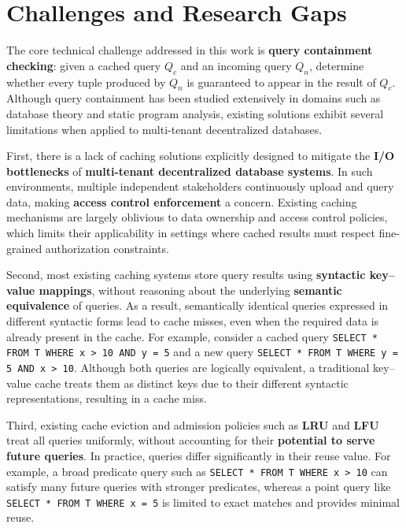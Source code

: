 \documentclass[12pt]{article}
\begin{document}
\section{Challenges and Research Gaps}

The core technical challenge addressed in this work is \textbf{query containment checking}: given a cached query \(Q_c\) and an incoming query \(Q_n\), determine whether every tuple produced by \(Q_n\) is guaranteed to appear in the result of \(Q_c\). Although query containment has been studied extensively in domains such as database theory and static program analysis, existing solutions exhibit several limitations when applied to multi-tenant decentralized databases.

First, there is a lack of caching solutions explicitly designed to mitigate the \textbf{I/O bottlenecks} of \textbf{multi-tenant decentralized database systems}. In such environments, multiple independent stakeholders continuously upload and query data, making \textbf{access control enforcement} a concern. Existing caching mechanisms are largely oblivious to data ownership and access control policies, which limits their applicability in settings where cached results must respect fine-grained authorization constraints.

Second, most existing caching systems store query results using \textbf{syntactic key--value mappings}, without reasoning about the underlying \textbf{semantic equivalence} of queries. As a result, semantically identical queries expressed in different syntactic forms lead to cache misses, even when the required data is already present in the cache. 
For example, consider a cached query \texttt{SELECT * FROM T WHERE x > 10 AND y = 5} and a new query \texttt{SELECT * FROM T WHERE y = 5 AND x > 10}. Although both queries are logically equivalent, a traditional key--value cache treats them as distinct keys due to their different syntactic representations, resulting in a cache miss.

Third, existing cache eviction and admission policies such as \textbf{LRU} and \textbf{LFU} treat all queries uniformly, without accounting for their \textbf{potential to serve future queries}. In practice, queries differ significantly in their reuse value. For example, a broad predicate query such as \texttt{SELECT * FROM T WHERE x > 10} can satisfy many future queries with stronger predicates, whereas a point query like \texttt{SELECT * FROM T WHERE x = 5} is limited to exact matches and provides minimal reuse.
\end{document}
